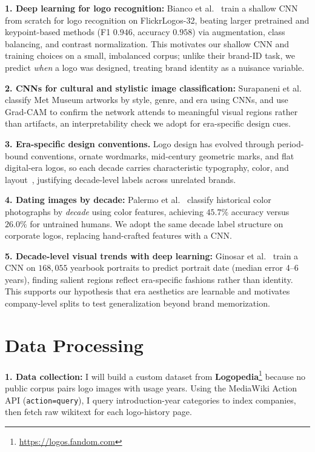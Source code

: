 \documentclass[final]{article}
\begin{document}
\textbf{1. Deep learning for logo recognition:}
Bianco et al.~\cite{bianco2017deep} train a shallow CNN from scratch for logo recognition on FlickrLogos-32, beating larger pretrained and keypoint-based methods (F1 $0.946$, accuracy $0.958$) via augmentation, class balancing, and contrast normalization. This motivates our shallow CNN and training choices on a small, imbalanced corpus; unlike their brand-ID task, we predict \emph{when} a logo was designed, treating brand identity as a nuisance variable.

\textbf{2. CNNs for cultural and stylistic image classification:}
Surapaneni et al.~\cite{surapaneni2020art} classify Met Museum artworks by style, genre, and era using CNNs, and use Grad-CAM to confirm the network attends to meaningful visual regions rather than artifacts, an interpretability check we adopt for era-specific design cues.

\textbf{3. Era-specific design conventions.}
Logo design has evolved through period-bound conventions, ornate wordmarks, mid-century geometric marks, and flat digital-era logos, so each decade carries characteristic typography, color, and layout~\cite{halcon2024logo}, justifying decade-level labels across unrelated brands.

\textbf{4. Dating images by decade:}
Palermo et al.~\cite{palermo2012dating} classify historical color photographs by \emph{decade} using color features, achieving $45.7\%$ accuracy versus $26.0\%$ for untrained humans.
We adopt the same decade label structure on corporate logos, replacing hand-crafted features with a CNN.

\textbf{5. Decade-level visual trends with deep learning:}
Ginosar et al.~\cite{ginosar2015yearbooks} train a CNN on $168{,}055$ yearbook portraits to predict portrait date (median error 4--6 years), finding salient regions reflect era-specific fashions rather than identity. This supports our hypothesis that era aesthetics are learnable and motivates company-level splits to test generalization beyond brand memorization.

\section*{Data Processing}

\textbf{1. Data collection:}
I will build a custom dataset from \textbf{Logopedia}\footnote{\url{https://logos.fandom.com}} because no public corpus pairs logo images with usage years.
Using the MediaWiki Action API (\texttt{action=query}), I query introduction-year categories to index companies, then fetch raw wikitext for each logo-history page.
\end{document}
